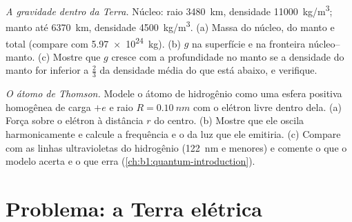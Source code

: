 \begin{exercise}[$\star\star\star$]\label{exo:b1:electrostatics-gauss:11}
\emph{A gravidade dentro da Terra.} Núcleo: raio \qty{3480}{km}, densidade
\qty{11000}{kg/m^3}; manto até \qty{6370}{km}, densidade \qty{4500}{kg/m^3}.
(a) Massa do núcleo, do manto e total (compare com \qty{5.97e24}{kg}).
(b) $g$ na superfície e na fronteira núcleo--manto. (c) Mostre que
$g$ cresce com a profundidade no manto se a densidade do manto for inferior a
$\tfrac23$ da densidade média do que está abaixo, e verifique.
\end{exercise}

\begin{exercise}[$\star\star\star$]\label{exo:b1:electrostatics-gauss:12}
\emph{O átomo de Thomson.} Modele o átomo de hidrogênio como uma esfera
positiva homogênea de carga $+e$ e raio $R = \qty{0.10}{nm}$ com o elétron
livre dentro dela. (a) Força sobre o elétron à distância $r$ do centro.
(b) Mostre que ele oscila harmonicamente e calcule a frequência e
o  da luz que ele emitiria. (c) Compare com as
linhas ultravioletas do hidrogênio (\qty{122}{nm} e menores) e comente
o que o modelo acerta e o que erra (\cref{ch:b1:quantum-introduction}).
\end{exercise}

\section{Problema: a Terra elétrica}

